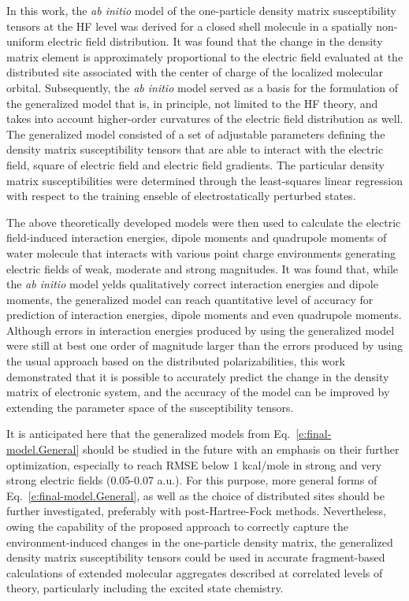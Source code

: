 \documentclass[aip,amsmath,amssymb,reprint,floatfix]{revtex4-1}
\begin{document}
In this work, the \emph{ab initio} model of the one\hyp{}particle density matrix susceptibility tensors
at the HF level was derived for a closed shell molecule in a spatially non\hyp{}uniform
electric field distribution. It was found that the change in the density matrix element
is approximately proportional to the electric field evaluated at the distributed site associated with the 
center of charge of the 
localized molecular orbital. Subsequently, the \emph{ab initio} model served as a basis
for the formulation of the generalized model that is, in principle, not limited to the HF theory,
and takes into account higher\hyp{}order curvatures of the electric field distribution as well.
The generalized model consisted of a set of adjustable parameters defining the density matrix susceptibility tensors
that are able to interact with the electric field, square of electric field and electric field gradients.
The particular density matrix susceptibilities were determined through the least\hyp{}squares 
linear regression with respect to the training enseble of electrostatically perturbed states.

The above theoretically developed models were then used to calculate the electric field\hyp{}induced
interaction energies, dipole moments and quadrupole moments of water molecule that
interacts with various point charge environments generating electric fields of weak, moderate
and strong magnitudes. It was found that, while the \emph{ab initio} model yelds qualitatively correct
interaction energies and dipole moments, the generalized model can reach quantitative level of accuracy
for prediction of interaction energies, dipole moments and even quadrupole moments. Although 
errors in interaction energies produced by using the generalized model 
were still at best one order of magnitude larger than the errors produced by using the
usual approach based on the distributed polarizabilities, this work demonstrated that it is possible to
accurately predict the change in the density matrix of electronic system, and the accuracy of the model
can be improved by extending the parameter space of the susceptibility tensors. 

It is anticipated here that the generalized models from Eq.~\eqref{e:final-model.General}
should be studied in the future with an emphasis 
on their further optimization, especially to reach RMSE below 1 kcal/mole
in strong and very strong electric fields (0.05-0.07 a.u.). 
For this purpose, more general forms of Eq.~\eqref{e:final-model.General}, as well as the choice of distributed
sites should be further investigated, preferably with post\hyp{}Hartree\hyp{}Fock methods.
Nevertheless, owing the capability of the proposed approach to correctly capture the 
environment\hyp{}induced changes in the one\hyp{}particle density matrix, 
the generalized density matrix susceptibility tensors 
could be used in accurate fragment\hyp{}based calculations of extended molecular aggregates
described at correlated levels of theory, particularly including the excited state chemistry.
\end{document}
